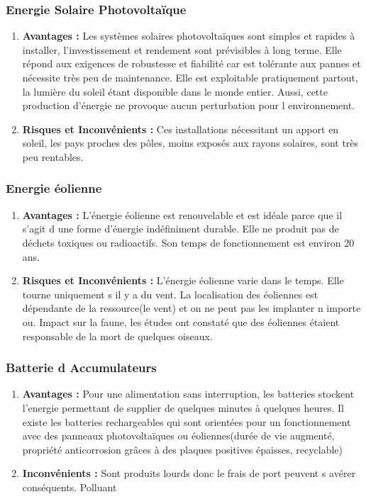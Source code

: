 \subsubsection{Energie Solaire Photovolta\"ique}
\begin{enumerate}
\item \textbf{Avantages :}
Les syst\`emes solaires photovoltaïques sont simples et rapides à installer, l'investissement  et rendement sont pr\'{e}visibles à long terme.
Elle r\'{e}pond aux exigences de robustesse et fiabilit\'{e} car est tolérante aux pannes et n\'{e}cessite tr\`es peu de maintenance. 
Elle est exploitable pratiquement partout, la lumi\`ere du soleil \'{e}tant disponible dans le monde entier. 
Aussi, cette production d'\'{e}nergie ne provoque aucun perturbation pour l environnement.

\item \textbf{Risques et Inconv\'enients :}
Ces installations n\'{e}cessitant un apport en soleil, les pays proches des pôles, moins expos\'{e}s aux rayons solaires, sont tr\`es peu rentables.
\end{enumerate}

\subsubsection{Energie \'{e}olienne}
\begin{enumerate}
\item \textbf{Avantages :}
L'\'{e}nergie \'{e}olienne est renouvelable et est id\'{e}ale parce que il s'agit d une forme d'\'{e}nergie ind\'{e}finiment durable.
Elle ne produit pas de d\'{e}chets toxiques ou radioactifs. 
Son temps de fonctionnement est environ 20 ans.

\item \textbf{Risques et Inconv\'enients :}
L'\'{e}nergie \'{e}olienne varie dans le temps.  Elle tourne uniquement s il y a du vent.
La localisation des \'{e}oliennes est d\'{e}pendante de la ressource(le vent) et on ne peut pas les implanter n importe ou. 
Impact sur la faune, les \'{e}tudes ont constat\'{e} que des \'{e}oliennes \'{e}taient responsable de la mort de quelques oiseaux.
\end{enumerate}


\subsubsection{Batterie d Accumulateurs}
\begin{enumerate}
\item \textbf{Avantages :}
Pour une alimentation sans interruption, les batteries stockent l'energie permettant de supplier de quelques minutes à quelques heures.
Il existe les batteries rechargeables qui sont orient\'{e}es pour un fonctionnement avec des panneaux photovoltaïques ou  \'{e}oliennes(dur\'{e}e de vie augment\'{e}, propriét\'{e} anticorrosion grâces à des plaques positives \'{e}paisses, recyclable)

\item \textbf{Inconv\'{e}nients :}
Sont produits lourds donc le frais de port peuvent s av\'{e}rer cons\'{e}quents.
Polluant

\end{enumerate}


